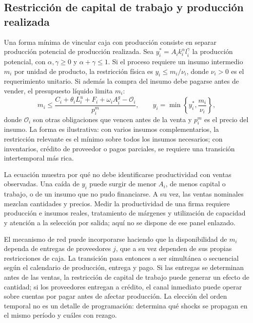 \documentclass[11pt,a4paper]{article}
\begin{document}
\subsection{Restricción de capital de trabajo y producción realizada}
Una forma mínima de vincular caja con producción consiste en separar producción potencial de producción realizada. Sea $y_i^*=A_i k_i^{\alpha}l_i^{\gamma}$ la producción potencial, con $\alpha,\gamma\geq0$ y $\alpha+\gamma\leq1$. Si el proceso requiere un insumo intermedio $m_i$ por unidad de producto, la restricción física es $y_i\leq m_i/\nu_i$, donde $\nu_i>0$ es el requerimiento unitario. Si además la compra del insumo debe pagarse antes de vender, el presupuesto líquido limita $m_i$:
\begin{equation}
 m_i\leq \frac{C_i+\theta_iL_i^u+F_i+\omega_iA_i^g-\mathcal O_i}{p_i^m},\qquad
 y_i=\min\left\{y_i^*,\frac{m_i}{\nu_i}\right\},
\label{eq:working_capital_prod}
\end{equation}
donde $\mathcal O_i$ son otras obligaciones que vencen antes de la venta y $p_i^m$ es el precio del insumo. La forma es ilustrativa: con varios insumos complementarios, la restricción relevante es el mínimo sobre todos los insumos necesarios; con inventarios, crédito de proveedor o pagos parciales, se requiere una transición intertemporal más rica.

La ecuación muestra por qué no debe identificarse productividad con ventas observadas. Una caída de $y_i$ puede surgir de menor $A_i$, de menos capital o trabajo, o de un insumo que no pudo financiarse. A su vez, las ventas nominales mezclan cantidades y precios. Medir la productividad de una firma requiere producción e insumos reales, tratamiento de márgenes y utilización de capacidad y atención a la selección por salida; aquí no se dispone de ese panel enlazado.

El mecanismo de red puede incorporarse haciendo que la disponibilidad de $m_i$ dependa de entregas de proveedores $j$, que a su vez dependen de sus propias restricciones de caja. La transición pasa entonces a ser simultánea o secuencial según el calendario de producción, entrega y pago. Si las entregas se determinan antes de las ventas, la restricción de capital de trabajo puede generar un efecto de cantidad; si los proveedores entregan a crédito, el canal inmediato puede operar sobre cuentas por pagar antes de afectar producción. La elección del orden temporal no es un detalle de programación: determina qué shocks se propagan en el mismo período y cuáles con rezago.
\end{document}
